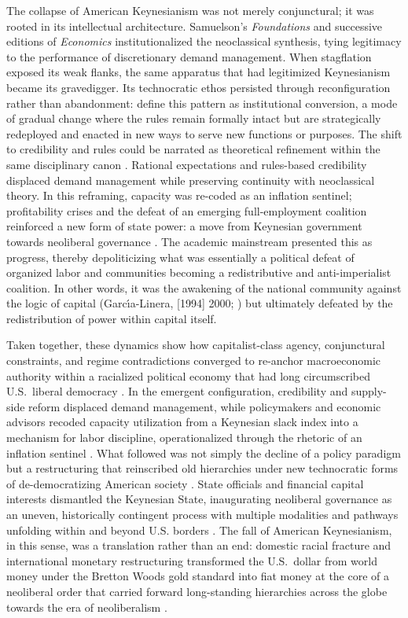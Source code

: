 \documentclass[11pt]{article}
\begin{document}
The collapse of American Keynesianism was not merely conjunctural; it was rooted in its intellectual architecture. Samuelson's \emph{Foundations} \citep{samuelson1947} and successive editions of \emph{Economics} \citep{samuelson1948} institutionalized the neoclassical synthesis, tying legitimacy to the performance of discretionary demand management. When stagflation exposed its weak flanks, the same apparatus that had legitimized Keynesianism became its gravedigger. Its technocratic ethos persisted through reconfiguration rather than abandonment: \citet{mahoneythelen2009} define this pattern as institutional conversion, a mode of gradual change where the rules remain formally intact but are strategically redeployed and enacted in new ways to serve new functions or purposes. The shift to credibility and rules could be narrated as theoretical refinement within the same disciplinary canon \citep{johnson2024}. Rational expectations and rules-based credibility displaced demand management while preserving continuity with neoclassical theory. In this reframing, capacity was re-coded as an inflation sentinel; profitability crises and the defeat of an emerging full-employment coalition reinforced a new form of state power: a move from Keynesian government towards neoliberal governance \citep{jessop2002}. The academic mainstream presented this as progress, thereby depoliticizing what was essentially a political defeat of organized labor and communities becoming a redistributive and anti-imperialist coalition. In other words, it was the awakening of the national community against the logic of capital (Garc{\'\i}a-Linera, [1994] 2000; \citealp{basu2022}) but ultimately defeated by the redistribution of power within capital itself.

Taken together, these dynamics show how capitalist-class agency, conjunctural constraints, and regime contradictions converged to re-anchor macroeconomic authority within a racialized political economy that had long circumscribed U.S.\ liberal democracy \citep{quijano2000,schiller2015}. In the emergent configuration, credibility and supply-side reform displaced demand management, while policymakers and economic advisors recoded capacity utilization from a Keynesian slack index into a mechanism for labor discipline, operationalized through the rhetoric of an inflation sentinel \citep{shaikhetal1999,johnson2024}. What followed was not simply the decline of a policy paradigm but a restructuring that reinscribed old hierarchies under new technocratic forms of de-democratizing American society \citep{gordonedwardsreich1982,kiely2016}. State officials and financial capital interests dismantled the Keynesian State, inaugurating neoliberal governance as an uneven, historically contingent process with multiple modalities and pathways unfolding within and beyond U.S. borders \citep{jessop2002,brenner2002,brennerpecktheodore2010}. The fall of American Keynesianism, in this sense, was a translation rather than an end: domestic racial fracture and international monetary restructuring transformed the U.S.\ dollar from world money under the Bretton Woods gold standard into fiat money at the core of a neoliberal order that carried forward long-standing hierarchies across the globe towards the era of neoliberalism \citep{harvey2007}.
\end{document}
